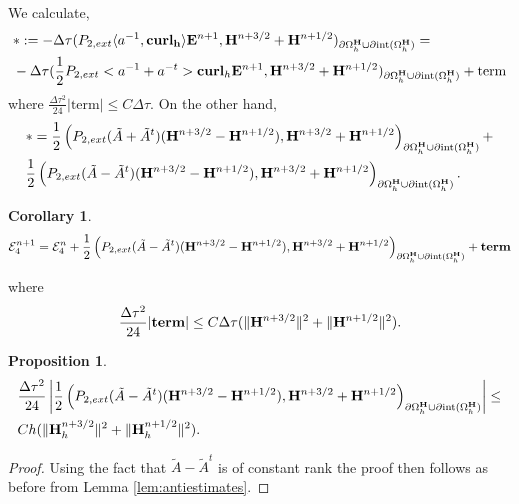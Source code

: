 \documentclass[12pt,reqno]{amsart}
\newcommand{\curl}{{\bf curl}}
\newcommand{\acurl}{\langle a^{-1},{\bf curl_h}\rangle}
\newcommand{\e}{{\bf E}}
\newcommand{\h}{{\bf H}}
\newtheorem{cor}[theorem]{Corollary}
\newtheorem{lem}[theorem]{Lemma}
\newtheorem{proposition}[theorem]{Proposition}
\theoremstyle{definition}
\numberwithin{equation}{section}
\newcommand{\intr}[1]{\mathrm{int}(#1)}
\def\Gwh{\Omega_h}
\begin{document}
We calculate,
\begin{align*}
&
*:=	-\Delta \tau( P_{2,ext}\acurl\e^{n+1},\h^{n+3/2}+\h^{n+1/2})_{\partial{\Gwh^\h}\cup \partial \intr{\Gwh^\h}}=\\&
		-\Delta \tau( \frac{1}{2}P_{2,ext}<a^{-1}+a^{-t}>\curl_h\e^{n+1},\h^{n+3/2}+\h^{n+1/2})_{\partial{\Gwh^\h}\cup \partial \intr{\Gwh^\h}}+\mathrm{term}
\end{align*}
where $\frac{\Delta \tau^2}{24}|\mathrm{term}|\leq C\Delta \tau$.
On the other hand,
\begin{align*}
	&
*=\frac{1}{2}\left( P_{2,ext}(\tilde{A}+\tilde{A}^{t})(\h^{n+3/2}-\h^{n+1/2}),
\h^{n+3/2}+\h^{n+1/2}\right)_{\partial{\Gwh^\h}\cup \partial \intr{\Gwh^\h}}+\\&
\frac{1}{2}\left( P_{2,ext}(\tilde{A}-\tilde{A}^{t})(\h^{n+3/2}-\h^{n+1/2}),
\h^{n+3/2}+\h^{n+1/2}\right)_{\partial{\Gwh^\h}\cup \partial \intr{\Gwh^\h}}.
\end{align*}
\begin{cor}
\begin{align*}
\mathcal{E}_4^{n+1}=\mathcal{E}_4^{n}+
\frac{1}{2}\left( P_{2,ext}(\tilde{A}-\tilde{A}^{t})(\h^{n+3/2}-\h^{n+1/2}),
\h^{n+3/2}+\h^{n+1/2}\right)_{\partial{\Gwh^\h}\cup \partial \intr{\Gwh^\h}}+\mathbf{term}
\end{align*}
\end{cor}
where $$\frac{\Delta \tau^2}{24}|\mathbf{term}|\leq 
C\Delta \tau(\|\h^{n+3/2}\|^2+\|\h^{n+1/2}\|^2).
$$
\begin{proposition}
	\begin{align*}
&
\frac{\Delta \tau^2}{24}\left |
\frac{1}{2}\left( P_{2,ext}(\tilde{A}-\tilde{A}^{t})(\h^{n+3/2}-\h^{n+1/2}),
\h^{n+3/2}+\h^{n+1/2}\right)_{\partial{\Gwh^\h}\cup \partial \intr{\Gwh^\h}}
\right|
\leq \\&
Ch(\| \h_h^{n+3/2}\|^2+\|\h_h^{n+1/2}\|^2).
\end{align*}
\end{proposition}
\begin{proof}
	Using the fact that $\tilde{A}-\tilde{A}^t$ is of constant rank
the proof then follows as before from Lemma \ref{lem:antiestimates}.
\end{proof}
\end{document}
